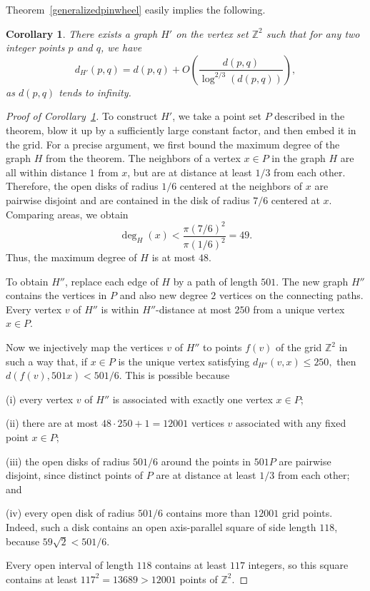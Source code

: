 \documentclass[12pt]{article}
\theoremstyle{plain}
\newtheorem{corollary}[theorem]{Corollary}
\theoremstyle{definition}
\theoremstyle{remark}
\newcommand{\ZZ}{{\mathbb Z}}
\begin{document}
Theorem~\ref{generalizedpinwheel} easily implies the following.

\begin{corollary}\label{inwheelongrid}
There exists a graph $H'$ on the vertex set ${\ZZ}^2$ such that for any two integer points $p$ and $q$, we have $$d_{H'}(p,q)=d(p,q)+O\left(\frac{d(p,q)}{\log^{2/3}(d(p,q))}\right),$$
as $d(p,q)$ tends to infinity.
\end{corollary}

\begin{proof}[Proof of Corollary~\ref{inwheelongrid}]
To construct $H'$, we take a point set $P$ described in the theorem, blow it up by a sufficiently large constant factor, and then embed it in the grid. For a precise argument, we first bound the maximum degree of the graph $H$ from the theorem. The neighbors of a vertex $x\in P$ in the graph $H$ are all within distance $1$ from $x$, but are at distance at least $1/3$ from each other. Therefore, the open disks of radius $1/6$ centered at the neighbors of $x$ are pairwise disjoint and are contained in the disk of radius $7/6$ centered at $x$. Comparing areas, we obtain
$$
\deg_H(x)<\frac{\pi(7/6)^2}{\pi(1/6)^2}=49.
$$
Thus, the maximum degree of $H$ is at most $48$.

To obtain $H''$, replace each edge of $H$ by a path of length $501$. The new graph $H''$ contains the vertices in $P$ and also new degree $2$ vertices on the connecting paths. Every vertex $v$ of $H''$ is within $H''$-distance at most $250$ from a unique vertex $x\in P$.

Now we injectively map the vertices $v$ of $H''$ to points $f(v)$ of the grid $\ZZ^2$ in such a way that, if $x\in P$ is the unique vertex satisfying
$d_{H''}(v,x)\leq 250,$ then $d(f(v),501x)<501/6.$ This is possible because

(i) every vertex $v$ of $H''$ is associated with exactly one vertex $x\in P$;

(ii) there are at most $48\cdot250+1=12001$
vertices $v$ associated with any fixed point $x\in P$;

(iii) the open disks of radius $501/6$ around the points in $501P$ are pairwise disjoint, since distinct points of $P$ are at distance at least $1/3$ from each other; and

(iv) every open disk of radius $501/6$ contains more than $12001$ grid points. Indeed, such a disk contains an open axis-parallel square of side length $118$, because $59\sqrt{2}<501/6.$

Every open interval of length $118$ contains at least $117$ integers, so this square contains at least
$117^2=13689>12001$ points of $\ZZ^2$.


\end{proof}
\end{document}
